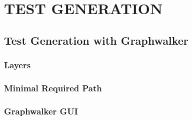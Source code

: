 \chapter{TEST GENERATION}
\label{chapter:test_generation}

\section{Test Generation with Graphwalker}
\subsection{Layers}
\subsection{Minimal Required Path}
\subsection{Graphwalker GUI} 